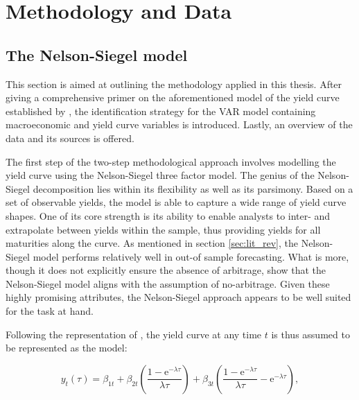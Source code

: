 \section{Methodology and Data}
\label{sec:method}

\subsection{The Nelson-Siegel model}
\label{sec:n-s_model}

This section is aimed at outlining the methodology applied in this thesis. After giving a comprehensive primer on the aforementioned model of the yield curve established by \citet{nelson1987parsimonious}, the identification strategy for the VAR model containing macroeconomic and yield curve variables is introduced. Lastly, an overview of the data and its sources is offered. 

The first step of the two-step methodological approach involves modelling the yield curve using the Nelson-Siegel three factor model. 
The genius of the Nelson-Siegel decomposition lies within its flexibility as well as its parsimony. 
Based on a set of observable yields, the model is able to capture a wide range of yield curve shapes. 
One of its core strength is its ability to enable analysts to inter- and extrapolate between yields within the sample, thus providing yields for all maturities along the curve.
As mentioned in section \ref{sec:lit_rev}, the Nelson-Siegel model performs relatively well in out-of sample forecasting.
What is more, though it does not explicitly ensure the absence of arbitrage, \citet{coroneo2011arbitrage} show that the Nelson-Siegel model aligns with the assumption of no-arbitrage. 
Given these highly promising attributes, the Nelson-Siegel approach appears to be well suited for the task at hand.

Following the representation of \citet{diebold2006macroeconomy}, the yield curve at any time $t$ is thus assumed to be represented as the \citet{nelson1987parsimonious} model:

\begin{equation}
\label{eq:NS_basic}
    y_{t}(\tau)=\beta_{1t}+\beta_{2t}\left(\frac{1-\mathrm{e}^{-\lambda \tau}}{\lambda \tau}\right)+\beta_{3t}\left(\frac{1-\mathrm{e}^{-\lambda \tau}}{\lambda \tau}-\mathrm{e}^{-\lambda \tau}\right),
\end{equation}

